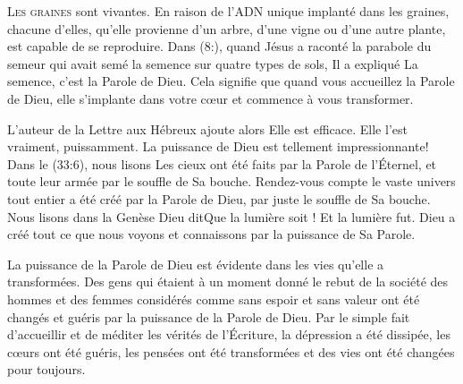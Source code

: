



\lettrine{L}{es graines} sont vivantes.
 En raison de l'ADN unique implanté dans les graines, chacune d'elles,
 qu'elle provienne d'un arbre, d'une vigne ou d'une autre plante,
 est capable de se reproduire.
 Dans (8:), quand Jésus a raconté la parabole du semeur
 qui avait semé la semence sur quatre types de sols,
 Il a expliqué\frcolon {}
 \Og La semence, c'est la Parole de Dieu. \Fg{}
 Cela signifie que quand vous accueillez la Parole de Dieu,
 elle s'implante dans votre c\oe{}ur et commence à vous transformer. 



L'auteur de la Lettre aux Hébreux ajoute alors\frcolon {}
 \Og Elle est efficace. \Fg{} 
 Elle l'est vraiment, puissamment.
 La puissance de Dieu est tellement impressionnante!
 Dans le (33:6), nous lisons\frcolon {}
 \Og Les cieux ont été faits par la Parole de l'Éternel,
 et toute leur armée par le souffle de Sa bouche. \Fg{}
 Rendez-vous compte \ocadr le vaste univers tout entier a été créé
 par la Parole de Dieu, par juste 
 le souffle de Sa bouche.
 Nous lisons dans la Genèse\frcolon {}
 \Og Dieu dit\frcolon Que la lumière soit ! Et la lumière fut. \Fg{}
 Dieu a créé tout ce que nous voyons et connaissons
 par la puissance de Sa Parole. 

La puissance de la Parole de Dieu est évidente dans les vies
 qu'elle a transformées. Des gens qui étaient à un moment donné
 le rebut de la société \ocadr des hommes et des femmes considérés
 comme sans espoir et sans valeur \fcadr{} ont été changés et guéris
 par la puissance de la Parole de Dieu.
 Par le simple fait d'accueillir et de méditer les vérités de l'Écriture,
 la dépression a été dissipée, les c\oe{}urs ont été guéris,
 les pensées ont été transformées et des vies ont été changées
 \ocadr pour toujours. 

\dvrule

